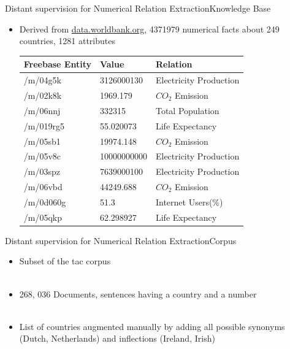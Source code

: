 \documentclass{beamer}
\begin{document}
\begin{frame}{Distant supervision for Numerical Relation Extraction}{Knowledge Base}
 \begin{itemize}
  \item Derived from \url{data.worldbank.org}, 4371979 numerical facts about 249 countries, 1281 attributes 
\begin{center}
\begin{tabular}{|l|l|l|}
\hline
Freebase Entity& Value & Relation\\
\hline
/m/04g5k&3126000130&Electricity Production\\
/m/02k8k&1969.179&$CO_{2}$ Emission\\
/m/06nnj&332315&Total Population\\
/m/019rg5&55.020073&Life Expectancy\\
/m/05sb1&19974.148&$CO_{2}$ Emission\\
/m/05v8c&10000000000&Electricity Production\\
/m/03spz&7639000100&Electricity Production\\
/m/06vbd&44249.688&$CO_{2}$ Emission\\
/m/0d060g&51.3&Internet Users(\%)\\
/m/05qkp&62.298927&Life Expectancy\\
\hline
\end{tabular}
\end{center}

\end{itemize}

\end{frame}

\begin{frame}{Distant supervision for Numerical Relation Extraction}{Corpus}

\begin{itemize}
 \item Subset of the tac corpus \\~\\
 \item 268, 036 Documents,  sentences having a country and a number  \\~\\
 \item List of countries augmented manually by adding all possible synonyms (Dutch, Netherlands) and inflections (Ireland, Irish)
\end{itemize}
\end{frame}
\end{document}
